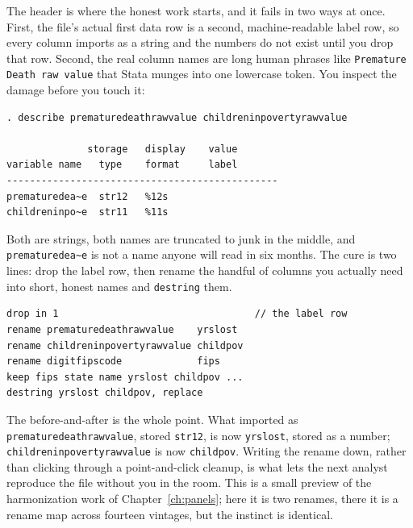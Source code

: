 \documentclass[
    a4paper,
    fontsize=10pt,
    twoside=true,
    numbers=noenddot,
]{kaobook}
\begin{document}
The header is where the honest work starts, and it fails in two ways at once. First, the file's actual first data row is a second, machine-readable label row, so every column imports as a string and the numbers do not exist until you drop that row. Second, the real column names are long human phrases like \texttt{Premature Death raw value} that Stata munges into one lowercase token. You inspect the damage before you touch it:
{\footnotesize
\begin{verbatim}
. describe prematuredeathrawvalue childreninpovertyrawvalue

              storage   display    value
variable name   type    format     label
-----------------------------------------------
prematuredea~e  str12   %12s
childreninpo~e  str11   %11s
\end{verbatim}
}
Both are strings, both names are truncated to junk in the middle, and \texttt{prematuredea\textasciitilde e} is not a name anyone will read in six months. The cure is two lines: drop the label row, then rename the handful of columns you actually need into short, honest names and \texttt{destring} them.
{\footnotesize
\begin{verbatim}
drop in 1                                  // the label row
rename prematuredeathrawvalue    yrslost
rename childreninpovertyrawvalue childpov
rename digitfipscode             fips
keep fips state name yrslost childpov ...
destring yrslost childpov, replace
\end{verbatim}
}
The before-and-after is the whole point. What imported as \texttt{prematuredeathrawvalue}, stored \texttt{str12}, is now \texttt{yrslost}, stored as a number; \texttt{childreninpovertyrawvalue} is now \texttt{childpov}. Writing the rename down, rather than clicking through a point-and-click cleanup, is what lets the next analyst reproduce the file without you in the room. This is a small preview of the harmonization work of Chapter~\ref{ch:panels}; here it is two renames, there it is a rename map across fourteen vintages, but the instinct is identical.
\end{document}
